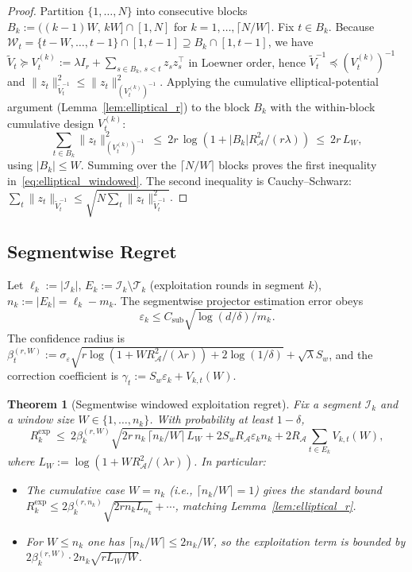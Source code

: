 \documentclass[11pt]{article}
\newcommand{\cA}{\mathcal{A}}
\newcommand{\cT}{\mathcal{T}}
\newcommand{\cI}{\mathcal{I}}
\newtheorem{theorem}{Theorem}
\begin{document}
\begin{proof}
Partition $\{1,\ldots,N\}$ into consecutive blocks $B_k:=((k-1)W,\,kW]\cap[1,N]$
for $k=1,\ldots,\lceil N/W\rceil$.  Fix $t\in B_k$.  Because
$\mathcal W_t=\{t-W,\ldots,t-1\}\cap[1,t-1]\supseteq B_k\cap[1,t-1]$, we have
$\widetilde V_t\succeq V_t^{(k)}:=\lambda I_r+\sum_{s\in B_k,\,s<t}z_sz_s^\top$
in Loewner order, hence $\widetilde V_t^{-1}\preceq(V_t^{(k)})^{-1}$ and
$\|z_t\|_{\widetilde V_t^{-1}}^2\le\|z_t\|_{(V_t^{(k)})^{-1}}^2$.  Applying the
cumulative elliptical-potential argument (Lemma~\ref{lem:elliptical_r}) to the
block $B_k$ with the within-block cumulative design $V_t^{(k)}$:
\[
  \sum_{t\in B_k}\|z_t\|_{(V_t^{(k)})^{-1}}^2
  \ \le\ 2r\,\log(1+|B_k|R_{\cA}^2/(r\lambda))
  \ \le\ 2r\,L_W,
\]
using $|B_k|\le W$.  Summing over the $\lceil N/W\rceil$ blocks proves the first
inequality in~\eqref{eq:elliptical_windowed}.  The second inequality is
Cauchy--Schwarz: $\sum_t\|z_t\|_{\widetilde V_t^{-1}}\le\sqrt{N\sum_t\|z_t\|_{\widetilde V_t^{-1}}^2}$.
\end{proof}

\subsection{Segmentwise Regret}
\label{sec:segmentwise_regret}

Let $\ell_k:=|\cI_k|$, $E_k:=\cI_k\setminus\cT_k$ (exploitation rounds in
segment $k$), $n_k:=|E_k|=\ell_k-m_k$.
The segmentwise projector estimation error obeys
\begin{equation}
  \varepsilon_k\le C_{\mathrm{sub}}\sqrt{\log(d/\delta)/m_k}.
  \label{eq:eps_k_rate}
\end{equation}
The confidence radius is
$\beta_t^{(r,W)}:=\sigma_\varepsilon\sqrt{r\log(1{+}WR_{\cA}^2/(\lambda r))
+2\log(1/\delta)}+\sqrt{\lambda}S_w$,
and the correction coefficient is $\gamma_t:=S_w\varepsilon_k+V_{k,t}(W)$.

\begin{theorem}[Segmentwise windowed exploitation regret]
\label{thm:segment_windowed_projected}
Fix a segment $\cI_k$ and a window size $W\in\{1,\ldots,n_k\}$.  With
probability at least $1-\delta$,
\begin{equation}
R_k^{\mathrm{exp}}\ \le\
2\beta_k^{(r,W)}\sqrt{2r\,n_k\,\lceil n_k/W\rceil\,L_W}
+ 2S_wR_{\cA}\varepsilon_k n_k
+ 2R_{\cA}\sum_{t\in E_k}V_{k,t}(W),
\label{eq:seg_win_reg}
\end{equation}
where $L_W:=\log(1+WR_{\cA}^2/(\lambda r))$.  In particular:
\begin{itemize}[leftmargin=1.2em,nosep]
\item The cumulative case $W=n_k$ (i.e., $\lceil n_k/W\rceil=1$) gives the
standard bound $R_k^{\mathrm{exp}}\le 2\beta_k^{(r,n_k)}\sqrt{2r n_k L_{n_k}}
+\cdots$, matching Lemma~\ref{lem:elliptical_r}.
\item For $W\le n_k$ one has $\lceil n_k/W\rceil\le 2n_k/W$, so the exploitation
term is bounded by $2\beta_k^{(r,W)}\cdot 2n_k\sqrt{r L_W/W}$.
\end{itemize}
\end{theorem}
\end{document}
